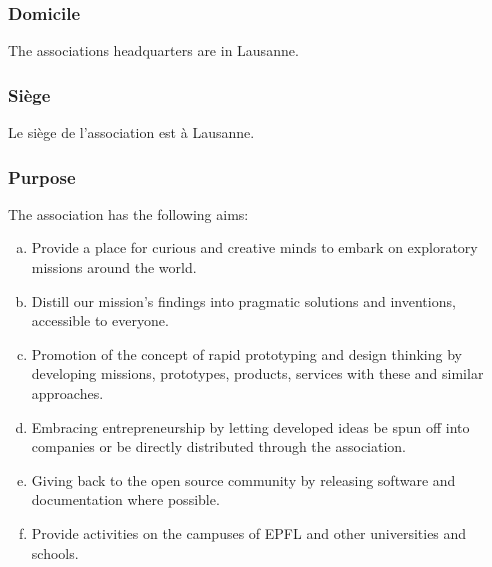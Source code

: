 \documentclass[12pt,a4paper,oneside]{article}
\newcounter{art}
\newcommand{\english}{    \switchcolumn[0]\noindent}
\newcommand{\french}{    \switchcolumn[1]\noindent}
\begin{document}
\begin{paracol}{2}
\english
	\subsubsection{Domicile}
	The associations headquarters are in Lausanne. 

\french
	\subsubsection{Siège}
	Le siège de l’association est à Lausanne.

\english
	\subsubsection{Purpose}
	The association has the following aims:

	\begin{enumerate}[(a)]

	\item Provide a place for curious and creative minds to embark on exploratory missions around the world.
	\item Distill our mission's findings into pragmatic solutions and inventions, accessible to everyone. 
	\item Promotion of the concept of rapid prototyping and design thinking by developing missions, prototypes, products, services with these and similar approaches.
	\item Embracing entrepreneurship by letting developed ideas be spun off into companies or be directly distributed through the association.
	\item Giving back to the open source community by releasing software and documentation where possible.
	\item Provide activities on the campuses of EPFL and other universities and schools.

	\end{enumerate}

\french

\end{paracol}
\end{document}
